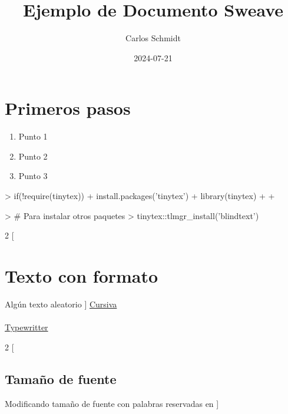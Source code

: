 \documentclass{article}
\title{Ejemplo de Documento Sweave}
\author{Carlos Schmidt}
\date{2024-07-21}
\begin{document}


\maketitle

\section*{Primeros pasos}

\begin{enumerate}
\item Punto 1
\item Punto 2
\item Punto 3

\end{enumerate}


\begin{Schunk}
\begin{Sinput}
> if(!require(tinytex)){
+   install.packages('tinytex')
+   library(tinytex)
+   
+ }
\end{Sinput}
\end{Schunk}


\begin{Schunk}
\begin{Sinput}
> # Para instalar otros paquetes
> tinytex::tlmgr_install('blindtext')
\end{Sinput}
\end{Schunk}

\begin{multicols}{2}
[
\section{Texto con formato}
Algún texto aleatorio
]
\noindent \underline{Cursiva}\\  \emph{\blindtext}   \\   \underline{Typewritter}  \\   \texttt{\blindtext}
\end{multicols}


\begin{multicols}{2}
[
\subsection{Tamaño de fuente}
Modificando tamaño de fuente con palabras reservadas en \LaTex
]
{\Huge \blindtext}   {\scriptsize \blindtext}
\end{multicols}
\end{document}
